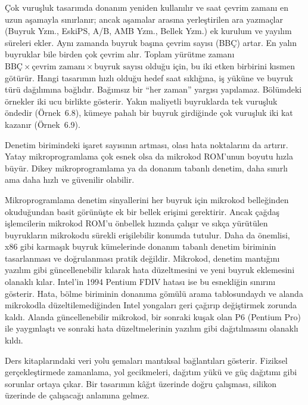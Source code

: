 Çok vuruşluk tasarımda donanım yeniden kullanılır ve saat çevrim zamanı en uzun aşamayla sınırlanır; ancak aşamalar arasına yerleştirilen ara yazmaçlar (Buyruk Yzm., EskiPS, A/B, AMB Yzm., Bellek Yzm.) ek kurulum ve yayılım süreleri ekler. Aynı zamanda buyruk başına çevrim sayısı (BBÇ) artar. En yalın buyruklar bile birden çok çevrim alır. Toplam yürütme zamanı $\text{BBÇ} \times \text{çevrim zamanı} \times \text{buyruk sayısı}$ olduğu için, bu iki etken birbirini kısmen götürür. Hangi tasarımın hızlı olduğu hedef saat sıklığına, iş yüküne ve buyruk türü dağılımına bağlıdır. Bağımsız bir ``her zaman'' yargısı yapılamaz. Bölümdeki örnekler iki ucu birlikte gösterir. Yakın maliyetli buyruklarda tek vuruşluk öndedir (Örnek~6.8), kümeye pahalı bir buyruk girdiğinde çok vuruşluk iki kat kazanır (Örnek~6.9).

Denetim birimindeki işaret sayısının artması, olası hata noktalarını da artırır. Yatay mikroprogramlama çok esnek olsa da mikrokod ROM'unun boyutu hızla büyür. Dikey mikroprogramlama ya da donanım tabanlı denetim, daha sınırlı ama daha hızlı ve güvenilir olabilir.

Mikroprogramlama denetim sinyallerini her buyruk için mikrokod belleğinden okuduğundan basit görünüşte ek bir bellek erişimi gerektirir. Ancak çağdaş işlemcilerin mikrokod ROM'u önbellek hızında çalışır ve sıkça yürütülen buyrukların mikrokodu sürekli erişilebilir konumda tutulur. Daha da önemlisi, x86 gibi karmaşık buyruk kümelerinde donanım tabanlı denetim biriminin tasarlanması ve doğrulanması pratik değildir. Mikrokod, denetim mantığını yazılım gibi güncellenebilir kılarak hata düzeltmesini ve yeni buyruk eklemesini olanaklı kılar. Intel'in 1994 Pentium FDIV hatası ise bu esnekliğin sınırını gösterir. Hata, bölme biriminin donanıma gömülü arama tablosundaydı ve alanda mikrokodla düzeltilemediğinden Intel yongaları geri çağırıp değiştirmek zorunda kaldı. Alanda güncellenebilir mikrokod, bir sonraki kuşak olan P6 (Pentium Pro) ile yaygınlaştı ve sonraki hata düzeltmelerinin yazılım gibi dağıtılmasını olanaklı kıldı.

Ders kitaplarındaki veri yolu şemaları mantıksal bağlantıları gösterir. Fiziksel gerçekleştirmede zamanlama, yol gecikmeleri, dağıtım yükü ve güç dağıtımı gibi sorunlar ortaya çıkar. Bir tasarımın kâğıt üzerinde doğru çalışması, silikon üzerinde de çalışacağı anlamına gelmez.

